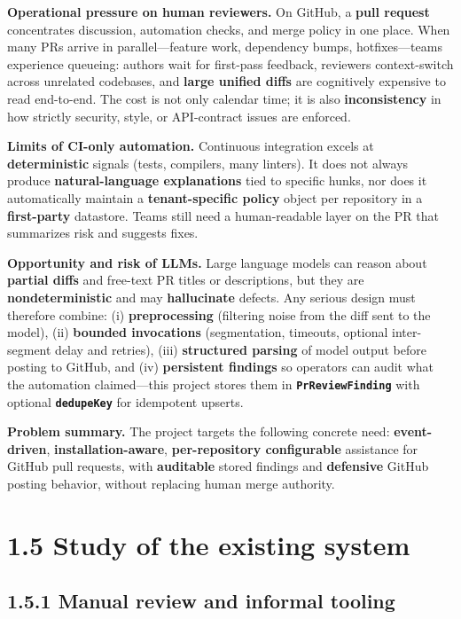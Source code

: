 \documentclass[11pt,a4paper]{report}
\begin{document}
\textbf{Operational pressure on human reviewers.} On GitHub, a \textbf{pull request} concentrates discussion, automation checks, and merge policy in one place. When many PRs arrive in parallel—feature work, dependency bumps, hotfixes—teams experience queueing: authors wait for first-pass feedback, reviewers context-switch across unrelated codebases, and \textbf{large unified diffs} are cognitively expensive to read end-to-end. The cost is not only calendar time; it is also \textbf{inconsistency} in how strictly security, style, or API-contract issues are enforced.


\textbf{Limits of CI-only automation.} Continuous integration excels at \textbf{deterministic} signals (tests, compilers, many linters). It does not always produce \textbf{natural-language explanations} tied to specific hunks, nor does it automatically maintain a \textbf{tenant-specific policy} object per repository in a \textbf{first-party} datastore. Teams still need a human-readable layer on the PR that summarizes risk and suggests fixes.


\textbf{Opportunity and risk of LLMs.} Large language models can reason about \textbf{partial diffs} and free-text PR titles or descriptions, but they are \textbf{nondeterministic} and may \textbf{hallucinate} defects. Any serious design must therefore combine: (i) \textbf{preprocessing} (filtering noise from the diff sent to the model), (ii) \textbf{bounded invocations} (segmentation, timeouts, optional inter-segment delay and retries), (iii) \textbf{structured parsing} of model output before posting to GitHub, and (iv) \textbf{persistent findings} so operators can audit what the automation claimed—this project stores them in \textbf{\texttt{PrReviewFinding}} with optional \textbf{\texttt{dedupeKey}} for idempotent upserts.


\textbf{Problem summary.} The project targets the following concrete need: \textbf{event-driven}, \textbf{installation-aware}, \textbf{per-repository configurable} assistance for GitHub pull requests, with \textbf{auditable} stored findings and \textbf{defensive} GitHub posting behavior, without replacing human merge authority.


\section{1.5 Study of the existing system}


\subsection{1.5.1 Manual review and informal tooling}
\end{document}
